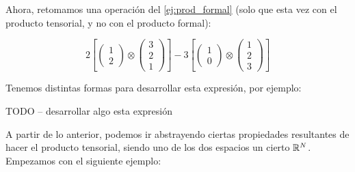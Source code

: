 \begin{ejemplo}
    Ahora, retomamos una operación del \ref{ej:prod_formal} (solo que esta vez con el producto tensorial, y no con el producto formal):

    $$
    2 \left[ \begin{pmatrix}1 \\ 2\end{pmatrix} \otimes \begin{pmatrix}3 \\ 2 \\ 1 \end{pmatrix} \right]
    - 3 \left[ \begin{pmatrix}1 \\ 0\end{pmatrix} \otimes \begin{pmatrix}1 \\ 2 \\ 3 \end{pmatrix} \right]
    $$

    Tenemos distintas formas para desarrollar esta expresión, por ejemplo:

    TODO -- desarrollar algo esta expresión

\end{ejemplo}

A partir de lo anterior, podemos ir abstrayendo ciertas propiedades resultantes de hacer el producto tensorial, siendo uno de los dos espacios un cierto $\mathbb{R}^N$. Empezamos con el siguiente ejemplo:

